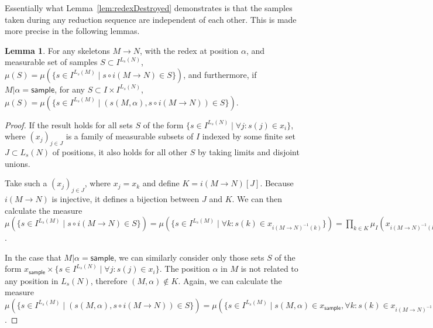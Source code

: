 \documentclass{article}
\newcommand{\tsample}{\mathsf{sample}}
\theoremstyle{definition}
\theoremstyle{lemma}
\newtheorem{lemma}{Lemma}
\theoremstyle{remark}
\begin{document}
Essentially what Lemma~\ref{lem:redexDestroyed} demonstrates is that the samples taken during any reduction sequence are independent of each other. This is made more precise in the following lemmas.

\begin{lemma}
For any skeletons $M \to N$, with the redex at position $\alpha$, and measurable set of samples $S \subset I^{L_s(N)}$, $\mu(S) = \mu(\{s \in I^{L_s(M)} \mid s \circ i(M \to N) \in S\})$, and furthermore, if $M | \alpha = \tsample$, for any $S \subset I \times I^{L_s(N)}$, $\mu(S) = \mu(\{s \in I^{L_s(M)} \mid (s(M,\alpha), s \circ i(M \to N)) \in S\})$.
\end{lemma}
\begin{proof}
If the result holds for all sets $S$ of the form $\{s \in I^{L_s(N)} \mid \forall j : s(j) \in x_i\}$, where $(x_j)_{j \in J}$ is a family of measurable subsets of $I$ indexed by some finite set $J \subset L_s(N)$ of positions, it also holds for all other $S$ by taking limits and disjoint unions.

Take such a $(x_j)_{j \in J}$, where $x_j = x_k$ and define $K = i(M \to N)[J]$. Because $i(M \to N)$ is injective, it defines a bijection between $J$ and $K$. We can then calculate the measure $\mu(\{s \in I^{L_s(M)} \mid s \circ i(M \to N) \in S\}) = \mu(\{s \in I^{L_s(M)} \mid \forall k : s(k) \in x_{i(M \to N)^{-1}(k)}\}) = \prod_{k \in K} \mu_I(x_{i(M \to N)^{-1}(k)}) = \prod_{j \in J} \mu_I(x_j) = \mu(S)$.

In the case that $M|\alpha = \tsample$, we can similarly consider only those sets $S$ of the form $x_\tsample \times \{s \in I^{L_s(N)} \mid \forall j : s(j) \in x_i\}$. The position $\alpha$ in $M$ is not related to any position in $L_s(N)$, therefore $(M,\alpha) \not \in K$. Again, we can calculate the measure $\mu(\{s \in I^{L_s(M)} \mid (s(M,\alpha), s \circ i(M \to N)) \in S\}) = \mu(\{s \in I^{L_s(M)} \mid s(M,\alpha) \in x_\tsample, \forall k : s(k) \in x_{i(M \to N)^{-1}(k)}\}) = \mu_I(x_\tsample) \prod_{k \in K} \mu_I(x_{i(M \to N)^{-1}(k)}) = \mu_I(x_\tsample) \prod_{j \in J} \mu_I(x_j) = \mu(S)$.
\end{proof}
\end{document}
